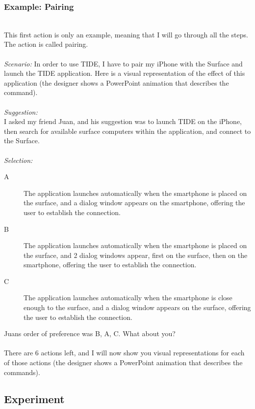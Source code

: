 \subsubsection{Example: Pairing}
\hfill\\
This first action is only an example, meaning that I will go through all the steps.
The action is called pairing.
\hfill\\
\hfill\\
\emph{Scenario:}
In order to use TIDE, I have to pair my iPhone with the Surface and launch the TIDE application.
Here is a visual representation of the effect of this application (the designer shows a PowerPoint animation that describes the command).
\hfill\\
\hfill\\
\emph{Suggestion:}\\
I asked my friend Juan, and his suggestion was to launch TIDE on the iPhone, then search for available surface computers within the application,  and connect to the Surface.
\hfill\\
\hfill\\
\emph{Selection:}
\begin{description}
\item[A]{The application launches automatically when the smartphone is placed on the surface, and a dialog window appears on the smartphone, offering the user to establish the connection.}
\item[B]{The application launches automatically when the smartphone is placed on the surface, and 2 dialog windows appear, first on the surface, then on the smartphone, offering the user to establish the connection.}
\item[C]{The application launches automatically when the smartphone is close enough to the surface, and a dialog window appears on the surface, offering the user to establish the connection.}
\end{description}

Juans order of preference was B, A, C.
What about you?
\hfill\\
\hfill\\
There are 6 actions left, and I will now show you visual representations for each of those actions (the designer shows a PowerPoint animation that describes the commands).

\subsection{Experiment}

